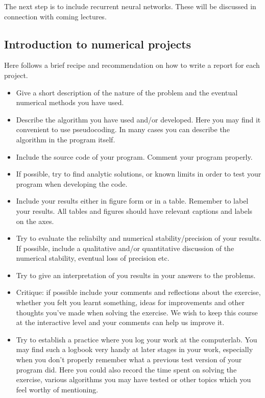 \documentclass[%
oneside,                 %
final,                   %
10pt]{article}
\begin{document}
The next step is to include recurrent neural networks. These will be discussed in connection with coming lectures.

\subsection*{Introduction to numerical projects}

Here follows a brief recipe and recommendation on how to write a report for each
project.

\begin{itemize}
  \item Give a short description of the nature of the problem and the eventual  numerical methods you have used.

  \item Describe the algorithm you have used and/or developed. Here you may find it convenient to use pseudocoding. In many cases you can describe the algorithm in the program itself.

  \item Include the source code of your program. Comment your program properly.

  \item If possible, try to find analytic solutions, or known limits in order to test your program when developing the code.

  \item Include your results either in figure form or in a table. Remember to        label your results. All tables and figures should have relevant captions        and labels on the axes.

  \item Try to evaluate the reliabilty and numerical stability/precision of your results. If possible, include a qualitative and/or quantitative discussion of the numerical stability, eventual loss of precision etc.

  \item Try to give an interpretation of you results in your answers to  the problems.

  \item Critique: if possible include your comments and reflections about the  exercise, whether you felt you learnt something, ideas for improvements and  other thoughts you've made when solving the exercise. We wish to keep this course at the interactive level and your comments can help us improve it.

  \item Try to establish a practice where you log your work at the  computerlab. You may find such a logbook very handy at later stages in your work, especially when you don't properly remember  what a previous test version  of your program did. Here you could also record  the time spent on solving the exercise, various algorithms you may have tested or other topics which you feel worthy of mentioning.
\end{itemize}
\end{document}
